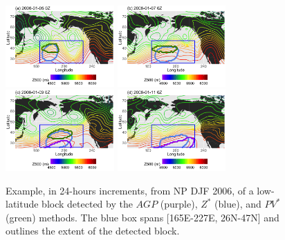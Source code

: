 \documentclass[smallextended]{svjour3}       %
\numberwithin{equation}{section}
\begin{document}
\begin{figure}
\centering
\includegraphics[width=0.37\textwidth]{fig12a}
\includegraphics[width=0.37\textwidth]{fig12b}\\
\includegraphics[width=0.37\textwidth]{fig12c}
\includegraphics[width=0.37\textwidth]{fig12d}
\caption{Example, in 24-hours increments, from NP DJF 2006, of a low-latitude block detected by the $AGP$ (purple), $Z^*$ (blue), and $PV^*$ (green) methods. The blue box spans [165E-227E, 26N-47N] and outlines the extent of the detected block.
}\label{lowlatdjf}
\end{figure}
\end{document}
